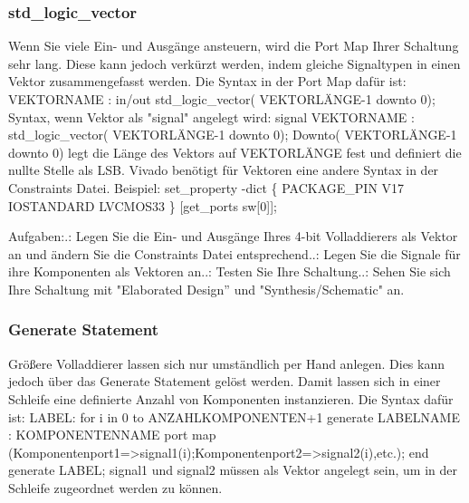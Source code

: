 \documentclass{article}
\begin{document}
\subsubsection{std\_logic\_vector}
Wenn Sie viele Ein- und Ausg\"ange ansteuern, wird die Port Map Ihrer Schaltung sehr lang. Diese kann jedoch verkürzt werden, indem gleiche Signaltypen in einen Vektor zusammengefasst werden. Die Syntax in der Port Map dafür ist:\newline
VEKTORNAME : in/out std\_logic\_vector( VEKTORL\"ANGE-1 downto 0);\newline
Syntax, wenn Vektor als "signal" angelegt wird:\newline
signal VEKTORNAME : std\_logic\_vector( VEKTORL\"ANGE-1 downto 0);\newline
Downto( VEKTORL\"ANGE-1 downto 0) legt die L\"ange des Vektors auf VEKTORL\"ANGE fest und definiert die nullte Stelle als LSB. Vivado ben\"otigt für Vektoren eine andere Syntax in der Constraints Datei. Beispiel:\newline
set\_property -dict \{ PACKAGE\_PIN V17   IOSTANDARD LVCMOS33 \} [get\_ports  sw[0]];\newline

Aufgaben:.: Legen Sie die Ein- und Ausg\"ange Ihres 4-bit Volladdierers als Vektor an und \"andern Sie die Constraints Datei entsprechend..: Legen Sie die Signale f\"ur ihre Komponenten als Vektoren an..: Testen Sie Ihre Schaltung..: Sehen Sie sich Ihre Schaltung mit "Elaborated Design'' und "Synthesis/Schematic" an.

\subsubsection{Generate Statement}
Gr\"o{\ss}ere Volladdierer lassen sich nur umst\"andlich per Hand anlegen. Dies kann jedoch \"uber das Generate Statement gel\"ost werden. Damit lassen sich in einer Schleife eine definierte Anzahl von Komponenten instanzieren. Die Syntax daf\"ur ist:\newline
LABEL:\newline
for i in 0 to ANZAHLKOMPONENTEN+1 generate\newline
LABELNAME : KOMPONENTENNAME port map\newline
(Komponentenport1=>signal1(i);Komponentenport2=>signal2(i),etc.);\newline
end generate LABEL;\newline
signal1 und signal2 m\"ussen als Vektor angelegt sein, um in der Schleife zugeordnet werden zu k\"onnen.\newline
\end{document}

